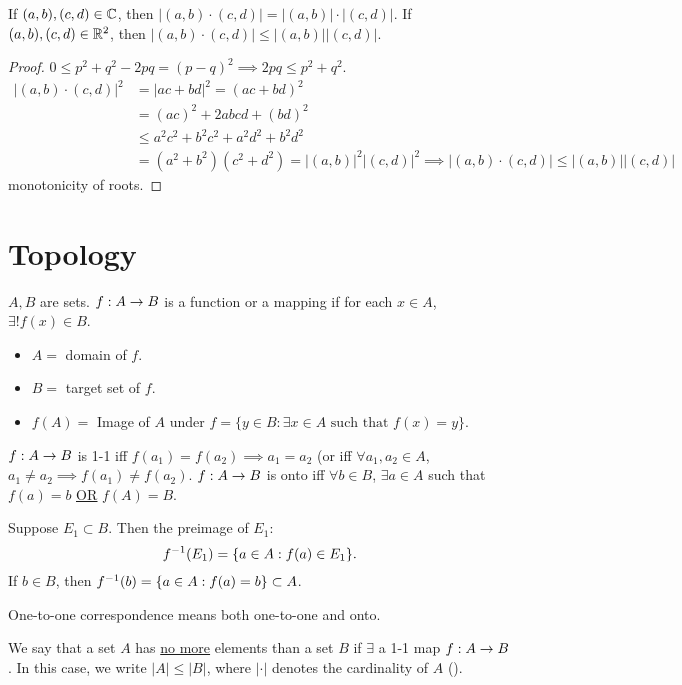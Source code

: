 \documentclass[]{article}
\begin{document}
If $(a,b),(c,d)\in\mathbb{C}$, then $|(a,b)\cdot(c,d)| = |(a,b)|\cdot|(c,d)|$.
If $(a,b),(c,d)\in\mathbb{R}^2$, then $|(a,b)\cdot(c,d)| \leq |(a,b)||(c,d)|$.
\begin{proof}
	$0\leq p^2+q^2 - 2pq = (p-q)^2 \implies 2pq \leq p^2 + q^2$.
	\begin{align*}
		|(a,b)\cdot(c,d)|^2 &= |ac+bd|^2 = (ac+bd)^2\\
				    &= (ac)^2 + 2abcd + (bd)^2 \\
		&\leq a^2c^2 + b^2c^2 + a^2d^2 + b^2d^2 \\
		&= (a^2+b^2)(c^2+d^2) = |(a,b)|^2 |(c,d)|^2 \implies |(a,b)\cdot (c,d)| \leq |(a,b)||(c,d)|
	\end{align*}
	monotonicity of roots.
\end{proof}

\section{Topology}

\begin{definition}
	[Function] $A,B$ are sets. $f:A\rightarrow B$ is a function or a mapping if for each $x\in A$, $\exists!f(x)\in B$.
	\begin{itemize}
		\item $A = $ domain of $f$.
		\item $B = $ target set of $f$.
		\item $f(A) = $ Image of $A$ under $f = \{y\in B: \exists x\in A \text{ such that } f(x)=y \}$.
	\end{itemize}
\end{definition}
\begin{definition}
	 $f:A\rightarrow B$ is 1-1 iff $f(a_1) = f(a_2) \implies a_1=a_2$ (or iff $\forall a_1,a_2\in A$, $a_1\neq a_2 \implies f(a_1)\neq f(a_2)$.
	$f:A\rightarrow B$ is onto iff $\forall b\in B$, $\exists a\in A$ such that $f(a)=b$ \ul{\ul{OR}} $f(A)=B$.
\end{definition}
\begin{definition}
	 Suppose $E_1\subset B$. Then the preimage of $E_1$: $$f^{-1}(E_1) = \{a\in A: f(a)\in E_1\}.$$
	If $b\in B$, then $f^{-1}(b) = \{a\in A : f(a)=b\} \subset A$.
\end{definition}
\begin{remark}
	One-to-one correspondence means both one-to-one and onto.
\end{remark}

\begin{definition}
	[Cardinality] We say that a set $A$ has \ul{no more} elements than a set $B$ if $\exists$ a 1-1 map $f:A\rightarrow B$.
	In this case, we write $|A|\leq |B|$, where $|\cdot|$ denotes the cardinality of $A$ ().
\end{definition}
\end{document}
